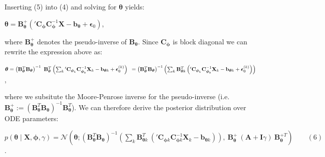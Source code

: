 \begin{par}
Inserting (5) into (4) and solving for $\boldsymbol\theta$ yields:
\end{par} \vspace{1em}
\begin{par}
$\boldsymbol\theta = \mathbf{B}_{\boldsymbol\theta}^+ \left( {'\mathbf{C}_{\boldsymbol\phi}}\mathbf{C}_{\boldsymbol\phi}^{-1} \mathbf{X} - \mathbf{b}_{\boldsymbol\theta} + \boldsymbol{\epsilon}_0\right)$,
\end{par} \vspace{1em}
\begin{par}
where $\mathbf{B}_{\boldsymbol\theta}^+$ denotes the pseudo-inverse of $\mathbf{B}_{\boldsymbol\theta}$. Since $\mathbf{C}_{\boldsymbol\phi}$ is block diagonal we can rewrite the expression above as:
\end{par} \vspace{1em}
\begin{par}
$\boldsymbol\theta = \left( \mathbf{B}_{\boldsymbol\theta}^T \mathbf{B}_{\boldsymbol\theta} \right)^{-1} ~\mathbf{B}_{\boldsymbol\theta}^T  \left( \sum_k {'\mathbf{C}_{\boldsymbol\phi_k}}\mathbf{C}_{\boldsymbol\phi_k}^{-1} \mathbf{X}_k - \mathbf{b}_{\boldsymbol\theta k} + \boldsymbol{\epsilon}_0^{(k)} \right)\\ ~= \left( \mathbf{B}_{\boldsymbol\theta}^T \mathbf{B}_{\boldsymbol\theta} \right)^{-1} \left(\sum_k \mathbf{B}_{\boldsymbol\theta k}^T \left( {'\mathbf{C}_{\boldsymbol\phi_k}}\mathbf{C}_{\boldsymbol\phi_k}^{-1} \mathbf{X}_k - \mathbf{b}_{\boldsymbol\theta k} +\boldsymbol{\epsilon}_0^{(k)} \right) \right)$,
\end{par} \vspace{1em}
\begin{par}
where we subsitute the Moore-Penrose inverse for the pseudo-inverse (i.e. $\mathbf{B}_{\boldsymbol\theta}^+ := \left( \mathbf{B}_{\boldsymbol\theta}^T \mathbf{B}_{\boldsymbol\theta}\right)^{-1} \mathbf{B}_{\boldsymbol\theta}^T$). We can therefore derive the posterior distribution over ODE parameters:
\end{par} \vspace{1em}
\begin{par}
$p(\boldsymbol\theta \mid \mathbf{X}, \boldsymbol\phi, \gamma) = \mathcal{N}\left(\boldsymbol\theta ; \left( \mathbf{B}_{\boldsymbol\theta}^T\mathbf{B}_{\boldsymbol\theta} \right)^{-1} \left( \sum_k \mathbf{B}_{\boldsymbol\theta k}^T ~\left( {'\mathbf{C}_{\boldsymbol\phi k}} \mathbf{C}_{\boldsymbol\phi k}^{-1} \mathbf{X}_k -\mathbf{b}_{\boldsymbol\theta k} \right) \right), ~ \mathbf{B}_{\boldsymbol\theta}^+ ~(\mathbf{A} + \mathbf{I}\gamma) ~ \mathbf{B}_{\boldsymbol\theta}^{+T}\right) \qquad (6)$.
\end{par} \vspace{1em}


